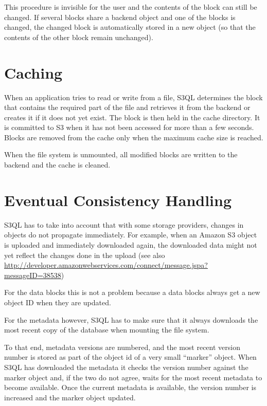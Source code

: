 \documentclass[letterpaper,10pt,english]{sphinxmanual}
\begin{document}
This procedure is invisible for the user and the contents of the block
can still be changed. If several blocks share a backend object and one
of the blocks is changed, the changed block is automatically stored in
a new object (so that the contents of the other block remain
unchanged).


\section{Caching}
\label{impl_details:caching}
When an application tries to read or write from a file, S3QL
determines the block that contains the required part of the file and
retrieves it from the backend or creates it if it does not yet exist.
The block is then held in the cache directory. It is committed to S3
when it has not been accessed for more than a few seconds. Blocks are
removed from the cache only when the maximum cache size is reached.

When the file system is unmounted, all modified blocks are written to
the backend and the cache is cleaned.


\section{Eventual Consistency Handling}
\label{impl_details:eventual-consistency-handling}
S3QL has to take into account that with some storage providers,
changes in objects do not propagate immediately. For example, when an
Amazon S3 object is uploaded and immediately downloaded again, the
downloaded data might not yet reflect the changes done in the upload
(see also
\href{http://developer.amazonwebservices.com/connect/message.jspa?messageID=38538}{http://developer.amazonwebservices.com/connect/message.jspa?messageID=38538})

For the data blocks this is not a problem because a data blocks always
get a new object ID when they are updated.

For the metadata however, S3QL has to make sure that it always
downloads the most recent copy of the database when mounting the file
system.

To that end, metadata versions are numbered, and the most recent
version number is stored as part of the object id of a very small
``marker'' object. When S3QL has downloaded the metadata it checks the
version number against the marker object and, if the two do not agree,
waits for the most recent metadata to become available. Once the
current metadata is available, the version number is increased and the
marker object updated.
\end{document}
